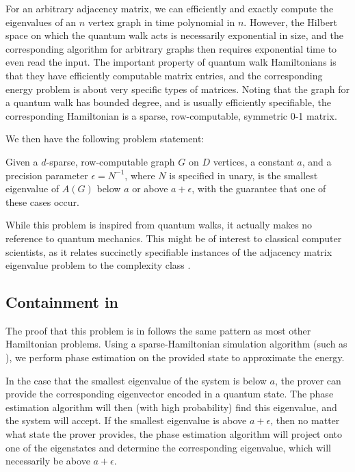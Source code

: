 \documentclass[../thesis-main/thesis-main]{subfiles}
\begin{document}
For an arbitrary adjacency matrix, we can efficiently and exactly compute the eigenvalues of an $n$ vertex graph in time polynomial in $n$. However, the Hilbert space on which the quantum walk acts is necessarily exponential in size, and the corresponding algorithm for arbitrary graphs then requires exponential time to even read the input.  The important property of quantum walk Hamiltonians is that they have efficiently computable matrix entries, and the corresponding energy problem is about very specific types of matrices.  Noting that the graph for a quantum walk has bounded degree, and is usually efficiently specifiable, the corresponding Hamiltonian is a sparse, row-computable, symmetric 0-1 matrix.  

We then have the following problem statement:

\begin{problem} Given a $d$-sparse, row-computable graph $G$ on $D$ vertices, a constant $a$, and a precision parameter $\epsilon = N^{-1}$, where $N$ is specified in unary, is the smallest eigenvalue of $A(G)$ below $a$ or above $a+\epsilon$, with the guarantee that one of these cases occur.
\end{problem}

While this problem is inspired from quantum walks, it actually makes no reference to quantum mechanics.  This might be of interest to classical computer scientists, as it relates succinctly specifiable instances of the adjacency matrix eigenvalue problem to the complexity class \QMA.

\subsection{Containment in \QMA}

The proof that this problem is in \QMA follows the same pattern as most other Hamiltonian problems.  Using a sparse-Hamiltonian simulation algorithm (such as \cite{BACS07,BCK15}), we perform phase estimation \cite{CEMM98} on the provided state to approximate the energy.


In the case that the smallest eigenvalue of the system is below $a$, the prover can provide the corresponding eigenvector encoded in a quantum state.  The phase estimation algorithm will then (with high probability) find this eigenvalue, and the system will accept.  If the smallest eigenvalue is above $a+\epsilon$, then no matter what state the prover provides, the phase estimation algorithm will project onto one of the eigenstates and determine the corresponding eigenvalue, which will necessarily be above $a+\epsilon$.
\end{document}
